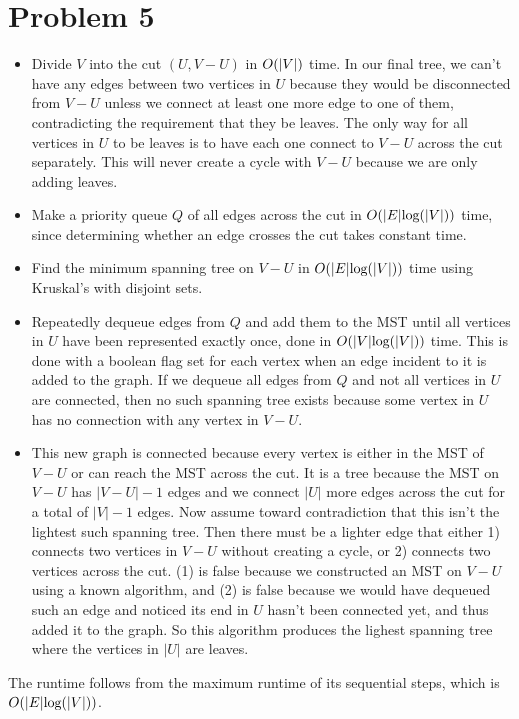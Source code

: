 \documentclass[11pt]{article}
\let\origleft\left
\let\origright\right
\renewcommand{\left}{\mathopen{}\mathclose\bgroup\origleft}
\renewcommand{\right}{\aftergroup\egroup\origright}
\newcommand{\p}[1]{\left(#1\right)}
\renewcommand{\log}[1]{\text{log}\p{#1}}
\newcommand{\BigOh}[1]{O\p{#1}}
\begin{document}
\newpage
\section*{Problem 5}
\begin{itemize}
\item Divide $V$ into the cut $(U,V-U)$ in $\BigOh{|V|}$ time. In our final tree, we can't have any edges between two vertices in $U$ because they would be disconnected from $V-U$ unless we connect at least one more edge to one of them, contradicting the requirement that they be leaves. The only way for all vertices in $U$ to be leaves is to have each one connect to $V-U$ across the cut separately. This will never create a cycle with $V-U$ because we are only adding leaves.
\item Make a priority queue $Q$ of all edges across the cut in $\BigOh{|E|\log{|V|}}$ time, since determining whether an edge crosses the cut takes constant time.
\item Find the minimum spanning tree on $V-U$ in $\BigOh{|E|\log{|V|}}$ time using Kruskal's with disjoint sets.
\item Repeatedly dequeue edges from $Q$ and add them to the MST until all vertices in $U$ have been represented exactly once, done in $\BigOh{|V|\log{|V|}}$ time. This is done with a boolean flag set for each vertex when an edge incident to it is added to the graph. If we dequeue all edges from $Q$ and not all vertices in $U$ are connected, then no such spanning tree exists because some vertex in $U$ has no connection with any vertex in $V-U$.
\item This new graph is connected because every vertex is either in the MST of $V-U$ or can reach the MST across the cut. It is a tree because the MST on $V-U$ has $|V-U|-1$ edges and we connect $|U|$ more edges across the cut for a total of $|V|-1$ edges. Now assume toward contradiction that this isn't the lightest such spanning tree. Then there must be a lighter edge that either 1) connects two vertices in $V-U$ without creating a cycle, or 2) connects two vertices across the cut. (1) is false because we constructed an MST on $V-U$ using a known algorithm, and (2) is false because we would have dequeued such an edge and noticed its end in $U$ hasn't been connected yet, and thus added it to the graph. So this algorithm produces the lighest spanning tree where the vertices in $|U|$ are leaves.
\end{itemize}
The runtime follows from the maximum runtime of its sequential steps, which is $\BigOh{|E|\log{|V|}}$.
\end{document}

